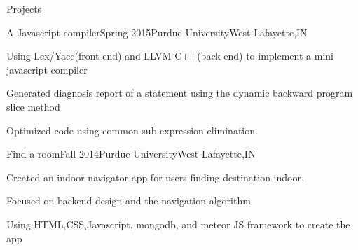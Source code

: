 \documentclass{resume} %
\begin{document}
\begin{rSection}{Projects}

\begin{rSubsection}{A Javascript compiler}{Spring 2015}{Purdue University}{West Lafayette,IN}
\item Using Lex/Yacc(front end) and LLVM C++(back end) to implement a mini javascript compiler
\item Generated diagnosis report of a statement using the dynamic backward program slice method  
\item Optimized code using common sub-expression elimination.
\end{rSubsection}


\begin{rSubsection}{Find a room}{Fall 2014}{Purdue University}{West Lafayette,IN}
\item Created an indoor navigator app for users finding destination indoor.
\item Focused on backend design and the navigation algorithm
\item Using HTML,CSS,Javascript, mongodb, and meteor JS framework to create the app
\end{rSubsection}







\end{rSection}
\end{document}
